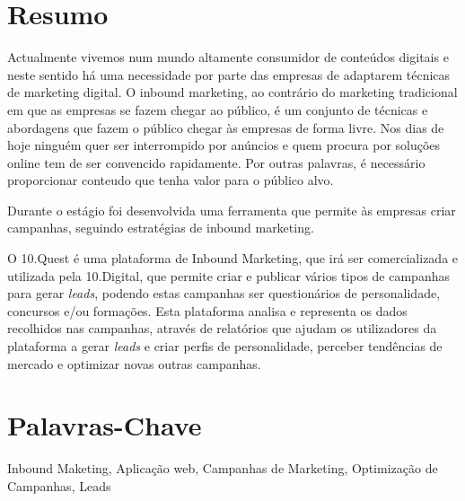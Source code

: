 \section*{Resumo}
\label{sec:resumo}

Actualmente vivemos num mundo altamente consumidor de conteúdos digitais e neste sentido há uma necessidade por parte das empresas de adaptarem técnicas de marketing digital. O inbound marketing, ao contrário do marketing tradicional em que as empresas se fazem chegar ao público, é um conjunto de técnicas e abordagens que fazem o público chegar às empresas de forma livre. Nos dias de hoje ninguém quer ser interrompido por anúncios e quem procura por soluções online tem de ser convencido rapidamente. Por outras palavras, é necessário proporcionar conteudo que tenha valor para o público alvo.

Durante o estágio foi desenvolvida uma ferramenta que permite às empresas criar campanhas, seguindo estratégias de inbound marketing. 

O 10.Quest é uma plataforma de Inbound Marketing, que irá ser comercializada e utilizada pela 10.Digital, que permite criar e publicar vários tipos de campanhas para gerar \textit{leads}, podendo estas campanhas ser questionários de personalidade, concursos e/ou formações. Esta plataforma analisa e representa os dados recolhidos nas campanhas, através de relatórios que ajudam os utilizadores da plataforma a gerar \textit{leads} e criar perfis de personalidade, perceber tendências de mercado e optimizar novas outras campanhas.



\section*{Palavras-Chave}
\label{sec:palavras}

Inbound Maketing, Aplicação web, Campanhas de Marketing, Optimização de Campanhas, Leads 

